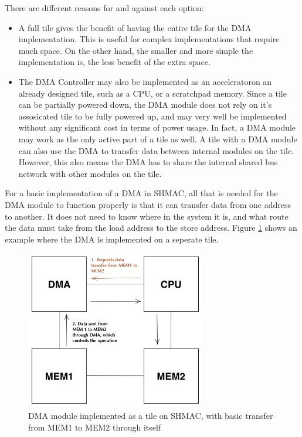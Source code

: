 There are different reasons for and against each option:
\begin{itemize}
    \item A full tile gives the benefit of having the entire tile for the DMA implementation.
    This is useful for complex implementations that require much space.
    On the other hand, the smaller and more simple the implementation is, the less benefit of the extra space.
    \item The DMA Controller may also be implemented as an acceleratoron an already designed tile, such as a CPU, or a scratchpad memory.
    Since a tile can be partially powered down, the DMA module does not rely on it's assosicated tile to be fully powered up, and may very well be implemented without any significant cost in terms of power usage.
    In fact, a DMA module may work as the only active part of a tile as well.
    A tile with a DMA module can also use the DMA to transfer data between internal modules on the tile.
    However, this also means the DMA has to share the internal shared bus network with other modules on the tile.
\end{itemize}

For a basic implementation of a DMA in SHMAC, all that is needed for the DMA module to function properly is that it can transfer data from one address to another.
It does not need to know where in the system it is, and what route the data must take from the load address to the store address.
Figure \ref{fig:DMASHMAC1} shows an example where the DMA is implemented on a seperate tile.

\begin{figure}[h!]
    \centering
    \includegraphics[width=0.7\textwidth]{Figures/DMA/DMASHMAC1}
    \caption{DMA module implemented as a tile on SHMAC, with basic transfer from MEM1 to MEM2 through itself}
    \label{fig:DMASHMAC1}
\end{figure}
 
